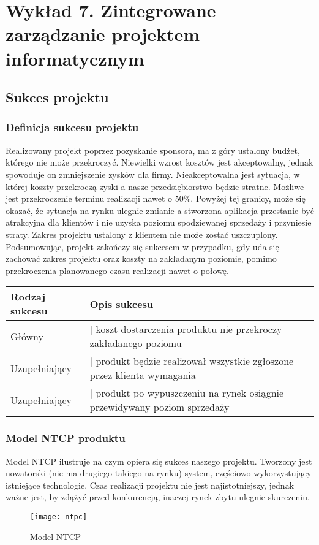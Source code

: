 \chapter{Wykład 7. Zintegrowane zarządzanie projektem informatycznym}

\section{Sukces projektu}

\subsection*{Definicja sukcesu projektu}
	Realizowany projekt poprzez pozyskanie sponsora, ma z góry ustalony budżet, którego nie może przekroczyć. Niewielki wzrost kosztów jest akceptowalny, jednak spowoduje on zmniejszenie zysków dla firmy. Nieakceptowalna jest sytuacja, w której koszty przekroczą zyski a nasze przedsiębiorstwo będzie stratne. Możliwe jest przekroczenie terminu realizacji nawet o 50\%. Powyżej tej granicy, może się okazać, że sytuacja na rynku ulegnie zmianie a stworzona aplikacja przestanie być atrakcyjna dla klientów i nie uzyska poziomu spodziewanej sprzedaży i przyniesie straty. Zakres projektu ustalony z klientem nie może zostać uszczuplony. Podsumowując, projekt zakończy się sukcesem w przypadku, gdy uda się zachować zakres projektu oraz koszty na zakładanym poziomie, pomimo przekroczenia planowanego czasu realizacji nawet o połowę.

\begin{center}
	\begin{tabular}{ll}
		Rodzaj sukcesu & Opis sukcesu \\
\hline
\hline
		Główny & | koszt dostarczenia produktu nie przekroczy zakładanego poziomu \\
\hline
		Uzupełniający & | produkt będzie realizował wszystkie zgłoszone przez klienta wymagania \\
\hline
		Uzupełniający & | produkt po wypuszczeniu na rynek osiągnie przewidywany poziom sprzedaży \\
\hline
	\end{tabular}
	\label{tab:defSukcesu}
\end{center}

\subsection*{Model NTCP produktu}
	Model NTCP ilustruje na czym opiera się sukces naszego projektu. Tworzony jest nowatorski (nie ma drugiego takiego na rynku) system, częściowo wykorzystujący istniejące technologie. Czas realizacji projektu nie jest najistotniejszy, jednak ważne jest, by zdążyć przed konkurencją, inaczej rynek zbytu ulegnie skurczeniu.
\begin{figure}[!h]
\centering
\texttt{[image: ntpc]}
\caption{Model NTCP}
\label{ntpc}
\end{figure}

